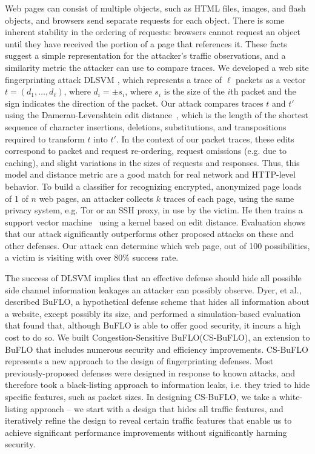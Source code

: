 \documentclass[11pt,oneside]{article}
\newcommand{\buflo} {BuFLO\xspace}
\newcommand{\csbuflo} {Congestion-Sensitive BuFLO\xspace}
\newcommand{\csb} {CS-BuFLO\xspace}
\begin{document}
Web pages can consist of multiple objects, such as HTML files, images, and
flash objects, and browsers send separate requests for each object. There is
some inherent stability in the ordering of requests: browsers cannot request an
object until they have received the portion of a page that references it. These
facts suggest a simple representation for the attacker's traffic observations,
	  and a similarity metric the attacker can use to compare traces.  We
	  developed a web site fingerprinting attack DLSVM \cite{cai-ccs12}, which
	  represents a trace of $\ell$ packets as a vector $t=(d_1, \ldots,
			  d_\ell)$, where $d_i=\pm s_i$, where $s_i$ is the size of the
	  $i$th packet and the sign indicates the direction of the packet.  Our
	  attack compares traces $t$ and $t'$ using the Damerau-Levenshtein edit
	  distance~\cite{navarro-acmcs01}, which is the length of the shortest
	  sequence of character insertions, deletions, substitutions, and
	  transpositions required to transform $t$ into $t'$. In the context of our
	  packet traces, these edits correspond to packet and request re-ordering,
	  request omissions (e.g. due to caching), and slight variations in the
	  sizes of requests and responses. Thus, this model and distance metric are
	  a good match for real network and HTTP-level behavior. To build a
	  classifier for recognizing encrypted, anonymized page loads of 1 of $n$
	  web pages, an attacker collects $k$ traces of each page, using the same
	  privacy system, e.g. Tor or an SSH proxy, in use by the victim.  He then
	  trains a support vector machine~\cite{vapnik-svm95} using a kernel based
	  on edit distance. Evaluation shows that our attack significantly
	  outperforms other proposed attacks on these and other defenses. Our
	  attack can determine which web page, out of 100 possibilities, a victim
	  is visiting with over 80\% success rate.

The success of DLSVM implies that an effective defense should hide all possible
side channel information leakages an attacker can possibly observe. Dyer, et
al., described \buflo, a hypothetical defense scheme that hides all information
about a website, except possibly its size, and performed a simulation-based
evaluation that found that, although \buflo is able to offer good security, it
incurs a high cost to do so. We built \csbuflo (\csb), an extension to \buflo
that includes numerous security and efficiency improvements.  \csb represents a
new approach to the design of fingerprinting defenses.  Most
previously-proposed defenses were designed in response to known attacks, and
therefore took a black-listing approach to information leaks, i.e. they tried
to hide specific features, such as packet sizes.  In designing \csb, we take a
white-listing approach -- we start with a design that hides all traffic
features, and iteratively refine the design to reveal certain traffic features
that enable us to achieve significant performance improvements without
significantly harming security. 
\end{document}
